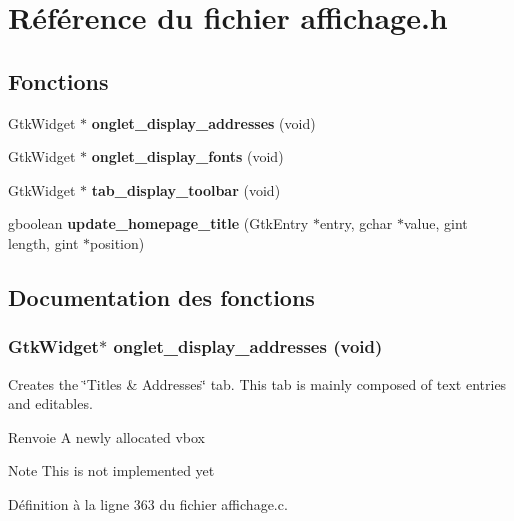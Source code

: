 \section{Référence du fichier affichage.h}
\label{affichage_8h}
\subsection*{Fonctions}
\begin{DoxyCompactItemize}
\item 
GtkWidget $\ast$ {\bf onglet\_\-display\_\-addresses} (void)
\item 
GtkWidget $\ast$ {\bf onglet\_\-display\_\-fonts} (void)
\item 
GtkWidget $\ast$ {\bf tab\_\-display\_\-toolbar} (void)
\item 
gboolean {\bf update\_\-homepage\_\-title} (GtkEntry $\ast$entry, gchar $\ast$value, gint length, gint $\ast$position)
\end{DoxyCompactItemize}


\subsection{Documentation des fonctions}
\subsubsection[{onglet\_\-display\_\-addresses}]{\setlength{\rightskip}{0pt plus 5cm}GtkWidget$\ast$ onglet\_\-display\_\-addresses (void)}\label{affichage_8h_a8188edfa1a69ab92d5aee186855442b8}
Creates the \char`\"{}Titles \& Addresses\char`\"{} tab. This tab is mainly composed of text entries and editables.

\begin{DoxyReturn}{Renvoie}
A newly allocated vbox 
\end{DoxyReturn}


\begin{DoxyNote}{Note}
This is not implemented yet 
\end{DoxyNote}




Définition à la ligne 363 du fichier affichage.c.

